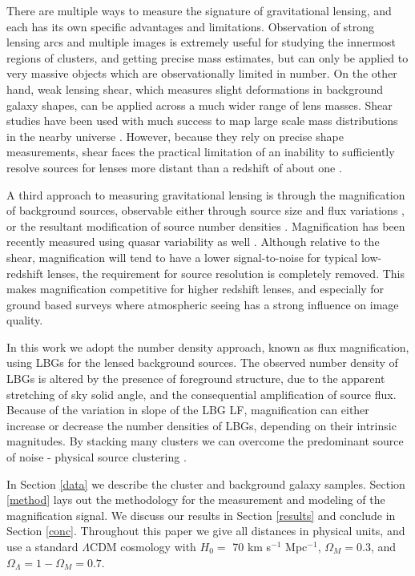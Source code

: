 There are multiple ways to measure the signature of gravitational lensing, and each has its own specific advantages and limitations. Observation of strong lensing arcs and multiple images is extremely useful for studying the innermost regions of clusters, and getting precise mass estimates, but can only be applied to very massive objects which are observationally limited in number. On the other hand, weak lensing shear, which measures slight deformations in background galaxy shapes, can be applied across a much wider range of lens masses. Shear studies have been used with much success to map large scale mass distributions in the nearby universe \citep{Waerbeke13, Massey07}. However, because they rely on precise shape measurements, shear faces the practical limitation of an inability to sufficiently resolve sources for lenses more distant than a redshift of about one \citep{LHJM10}.

A third approach to measuring gravitational lensing is through the magnification of background sources, observable either through source size and flux variations \citep{Schmidt12,Huff14}, or the resultant modification of source number densities \citep{Ford12, Morrison12, Hildebrandt13, Hildebrandt11, Hildebrandt09b, Scranton05}. Magnification has been recently measured using quasar variability as well \citep{Bauer11}. Although relative to the shear, magnification will tend to have a lower signal-to-noise for typical low-redshift lenses, the requirement for source resolution is completely removed. This makes magnification competitive for higher redshift lenses, and especially for ground based surveys where atmospheric seeing has a strong influence on image quality.

In this work we adopt the number density approach, known as flux magnification, using \ac{LBG}s for the lensed background sources. The observed number density of \ac{LBG}s is altered by the presence of foreground structure, due to the apparent stretching of sky solid angle, and the consequential amplification of source flux. Because of the variation in slope of the \ac{LBG} \ac{LF}, magnification can either increase or decrease the number densities of \ac{LBG}s, depending on their intrinsic magnitudes. By stacking many clusters we can overcome the predominant source of noise - physical source clustering \citep{Hildebrandt11}. 

In Section \ref{data} we describe the cluster and background galaxy samples. Section \ref{method} lays out the methodology for the measurement and modeling of the magnification signal. We discuss our results in Section \ref{results} and conclude in Section \ref{conc}. Throughout this paper we give all distances in physical units, and use a standard $\Lambda$CDM cosmology with $H_0 =$ 70 km s$^{-1}$ Mpc$^{-1}$, $\Omega_M = 0.3$, and $\Omega_{\Lambda} = 1 - \Omega_M = 0.7$.

